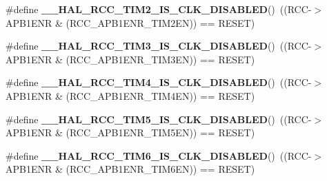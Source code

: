 \begin{DoxyCompactItemize}
\item 
\mbox{\label{group___r_c_c_ex___peripheral___clock___enable___disable___status_gacaaa75c78c8ef4cf85f30fb20d522054}} 
\#define {\bfseries \+\_\+\+\_\+\+H\+A\+L\+\_\+\+R\+C\+C\+\_\+\+T\+I\+M2\+\_\+\+I\+S\+\_\+\+C\+L\+K\+\_\+\+D\+I\+S\+A\+B\+L\+ED}()~((R\+CC-\/$>$A\+P\+B1\+E\+NR \& (R\+C\+C\+\_\+\+A\+P\+B1\+E\+N\+R\+\_\+\+T\+I\+M2\+EN)) == R\+E\+S\+ET)
\item 
\mbox{\label{group___r_c_c_ex___peripheral___clock___enable___disable___status_ga50f8e043a42eaf534c1efa2477078c0a}} 
\#define {\bfseries \+\_\+\+\_\+\+H\+A\+L\+\_\+\+R\+C\+C\+\_\+\+T\+I\+M3\+\_\+\+I\+S\+\_\+\+C\+L\+K\+\_\+\+D\+I\+S\+A\+B\+L\+ED}()~((R\+CC-\/$>$A\+P\+B1\+E\+NR \& (R\+C\+C\+\_\+\+A\+P\+B1\+E\+N\+R\+\_\+\+T\+I\+M3\+EN)) == R\+E\+S\+ET)
\item 
\mbox{\label{group___r_c_c_ex___peripheral___clock___enable___disable___status_ga30913be6e4b95cf2ebdf79647af18f34}} 
\#define {\bfseries \+\_\+\+\_\+\+H\+A\+L\+\_\+\+R\+C\+C\+\_\+\+T\+I\+M4\+\_\+\+I\+S\+\_\+\+C\+L\+K\+\_\+\+D\+I\+S\+A\+B\+L\+ED}()~((R\+CC-\/$>$A\+P\+B1\+E\+NR \& (R\+C\+C\+\_\+\+A\+P\+B1\+E\+N\+R\+\_\+\+T\+I\+M4\+EN)) == R\+E\+S\+ET)
\item 
\mbox{\label{group___r_c_c_ex___peripheral___clock___enable___disable___status_gacbe7ae446991adf3d9d6102549a3faac}} 
\#define {\bfseries \+\_\+\+\_\+\+H\+A\+L\+\_\+\+R\+C\+C\+\_\+\+T\+I\+M5\+\_\+\+I\+S\+\_\+\+C\+L\+K\+\_\+\+D\+I\+S\+A\+B\+L\+ED}()~((R\+CC-\/$>$A\+P\+B1\+E\+NR \& (R\+C\+C\+\_\+\+A\+P\+B1\+E\+N\+R\+\_\+\+T\+I\+M5\+EN)) == R\+E\+S\+ET)
\item 
\mbox{\label{group___r_c_c_ex___peripheral___clock___enable___disable___status_ga70e84a0b11a0dab64a048f8dd6bbafb2}} 
\#define {\bfseries \+\_\+\+\_\+\+H\+A\+L\+\_\+\+R\+C\+C\+\_\+\+T\+I\+M6\+\_\+\+I\+S\+\_\+\+C\+L\+K\+\_\+\+D\+I\+S\+A\+B\+L\+ED}()~((R\+CC-\/$>$A\+P\+B1\+E\+NR \& (R\+C\+C\+\_\+\+A\+P\+B1\+E\+N\+R\+\_\+\+T\+I\+M6\+EN)) == R\+E\+S\+ET)
\item 

\end{DoxyCompactItemize}
